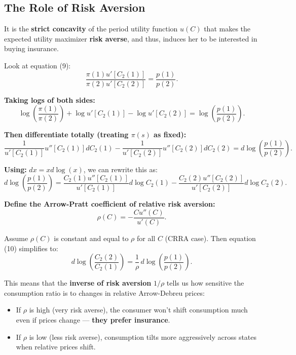 \documentclass[12pt]{article}
\begin{document}
\subsection*{The Role of Risk Aversion}

It is the \textbf{strict concavity} of the period utility function $u(C)$ that makes the expected utility maximizer \textbf{risk averse}, and thus, induces her to be interested in buying insurance.

\bigskip

Look at equation (9):
\[
\frac{\pi(1)u'[C_2(1)]}{\pi(2)u'[C_2(2)]} = \frac{p(1)}{p(2)}.
\]

\textbf{Taking logs of both sides:}
\[
\log \left( \frac{\pi(1)}{\pi(2)} \right) + \log u'[C_2(1)] - \log u'[C_2(2)] = \log \left( \frac{p(1)}{p(2)} \right).
\]

\textbf{Then differentiate totally (treating $\pi(s)$ as fixed):}
\[
\frac{1}{u'[C_2(1)]} u''[C_2(1)] dC_2(1) - \frac{1}{u'[C_2(2)]} u''[C_2(2)] dC_2(2) = d \log \left( \frac{p(1)}{p(2)} \right).
\]

\textbf{Using:} $dx = x d\log(x)$, we can rewrite this as:
\begin{equation}
d \log \left( \frac{p(1)}{p(2)} \right) = \frac{C_2(1) u''[C_2(1)]}{u'[C_2(1)]} d \log C_2(1) - \frac{C_2(2) u''[C_2(2)]}{u'[C_2(2)]} d \log C_2(2).
\tag{10}
\end{equation}

\textbf{Define the Arrow-Pratt coefficient of relative risk aversion:}
\[
\rho(C) = - \frac{C u''(C)}{u'(C)}.
\]

Assume $\rho(C)$ is constant and equal to $\rho$ for all $C$ (CRRA case). Then equation (10) simplifies to:
\[
d \log \left( \frac{C_2(2)}{C_2(1)} \right) = \frac{1}{\rho} \, d \log \left( \frac{p(1)}{p(2)} \right).
\]

\bigskip

This means that the \textbf{inverse of risk aversion} $1/\rho$ tells us how sensitive the consumption ratio is to changes in relative Arrow-Debreu prices:
\begin{itemize}
    \item If $\rho$ is high (very risk averse), the consumer won't shift consumption much even if prices change — \textbf{they prefer insurance}.
    \item If $\rho$ is low (less risk averse), consumption tilts more aggressively across states when relative prices shift.
\end{itemize}
\end{document}
